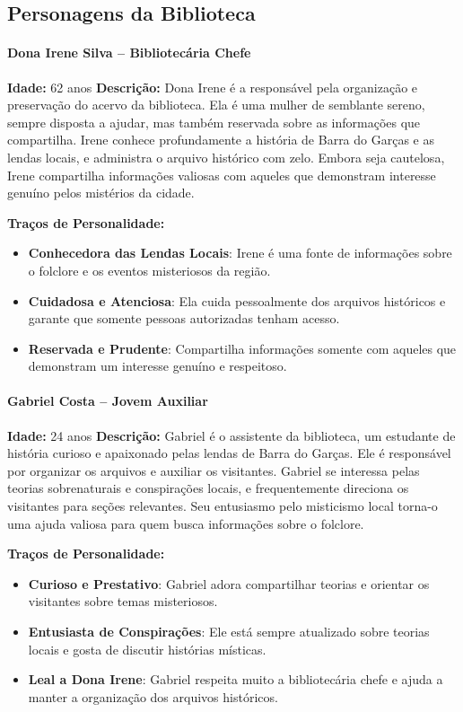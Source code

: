 \subsection{Personagens da Biblioteca}

\begin{personagem}  
\paragraph{Dona Irene Silva – Bibliotecária Chefe}  
\textbf{Idade:} 62 anos  
\textbf{Descrição:}  
Dona Irene é a responsável pela organização e preservação do acervo da biblioteca. Ela é uma mulher de semblante sereno, sempre disposta a ajudar, mas também reservada sobre as informações que compartilha. Irene conhece profundamente a história de Barra do Garças e as lendas locais, e administra o arquivo histórico com zelo. Embora seja cautelosa, Irene compartilha informações valiosas com aqueles que demonstram interesse genuíno pelos mistérios da cidade.

\textbf{Traços de Personalidade:}
\begin{itemize}
    \item \textbf{Conhecedora das Lendas Locais}: Irene é uma fonte de informações sobre o folclore e os eventos misteriosos da região.
    \item \textbf{Cuidadosa e Atenciosa}: Ela cuida pessoalmente dos arquivos históricos e garante que somente pessoas autorizadas tenham acesso.
    \item \textbf{Reservada e Prudente}: Compartilha informações somente com aqueles que demonstram um interesse genuíno e respeitoso.
\end{itemize}
\end{personagem}
\begin{personagem}  
\paragraph{Gabriel Costa – Jovem Auxiliar}  
\textbf{Idade:} 24 anos  
\textbf{Descrição:}  
Gabriel é o assistente da biblioteca, um estudante de história curioso e apaixonado pelas lendas de Barra do Garças. Ele é responsável por organizar os arquivos e auxiliar os visitantes. Gabriel se interessa pelas teorias sobrenaturais e conspirações locais, e frequentemente direciona os visitantes para seções relevantes. Seu entusiasmo pelo misticismo local torna-o uma ajuda valiosa para quem busca informações sobre o folclore.

\textbf{Traços de Personalidade:}
\begin{itemize}
    \item \textbf{Curioso e Prestativo}: Gabriel adora compartilhar teorias e orientar os visitantes sobre temas misteriosos.
    \item \textbf{Entusiasta de Conspirações}: Ele está sempre atualizado sobre teorias locais e gosta de discutir histórias místicas.
    \item \textbf{Leal a Dona Irene}: Gabriel respeita muito a bibliotecária chefe e ajuda a manter a organização dos arquivos históricos.
\end{itemize}
\end{personagem}

